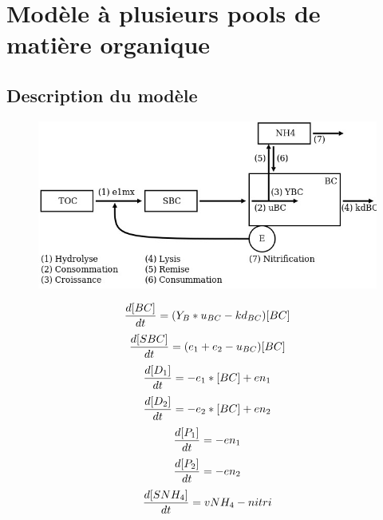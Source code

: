 \newpage
\section{Mod\`ele \`a plusieurs pools de matière organique}
\subsection{Description du mod\`ele}

\par{
}

\begin{figure}[h!]
  \includegraphics[width=\textwidth]{partie1/scan1.jpg}
  \caption{\todo}
  \label{fig:partie2diagconc}
\end{figure}

\begin{equation}
  {{d[BC]}\over{dt}} = (Y_B * u_{BC} - kd_{BC}) [BC]
  \label{eq:eq1}
\end{equation}
\begin{equation}
  {{d[SBC]}\over{dt}} = (e_1 + e_2 - u_{BC}) [BC]
  \label{eq:eq2}
\end{equation}
\begin{equation}
  {{d[D_1]}\over{dt}} = - e_1 * [BC] + en_1
  \label{eq:eq3}
\end{equation}
\begin{equation}
  {{d[D_2]}\over{dt}} = - e_2 * [BC] + en_2
  \label{eq:eq4}
\end{equation}
\begin{equation}
  {{d[P_1]}\over{dt}} = - en_1
  \label{eq:eq5}
\end{equation}
\begin{equation}
  {{d[P_2]}\over{dt}} = - en_2
  \label{eq:eq6}
\end{equation}
\begin{equation}
  {{d[SNH_4]}\over{dt}} =
  vNH_4 - nitri
  \label{eq:eq7}
\end{equation}

